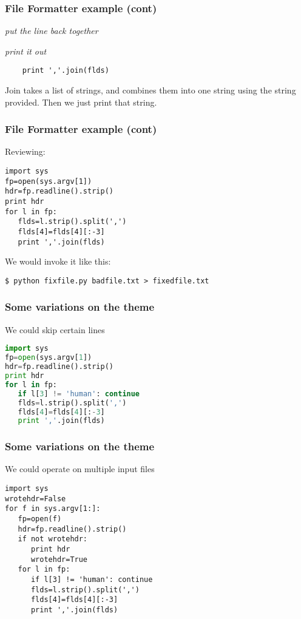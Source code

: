 \documentclass[10pt]{beamer}
\begin{document}
\begin{frame}[fragile]
\frametitle{File Formatter example (cont)}


\textit{put the line back together}

\textit{print it out}

\begin{verbatim}
    print ','.join(flds)
\end{verbatim}

Join takes a list of strings, and combines them into one string using the 
string provided. Then we just print that string.  
 
\end{frame}

\begin{frame}[fragile]
\frametitle{File Formatter example (cont)}

Reviewing:

\begin{verbatim}
import sys
fp=open(sys.argv[1])
hdr=fp.readline().strip()
print hdr
for l in fp:
   flds=l.strip().split(',')
   flds[4]=flds[4][:-3]
   print ','.join(flds)
\end{verbatim}


We would invoke it like this:
\begin{verbatim}
$ python fixfile.py badfile.txt > fixedfile.txt
\end{verbatim}

\end{frame}

\begin{frame}[fragile]
\frametitle{Some variations on the theme}

We could skip certain lines

\begin{lstlisting}[language=python]
import sys
fp=open(sys.argv[1])
hdr=fp.readline().strip()
print hdr
for l in fp:
   if l[3] != 'human': continue
   flds=l.strip().split(',')
   flds[4]=flds[4][:-3]
   print ','.join(flds)
\end{lstlisting}
\end{frame}

\begin{frame}[fragile]
\frametitle{Some variations on the theme}

We could operate on multiple input files

\begin{verbatim}
import sys
wrotehdr=False
for f in sys.argv[1:]:
   fp=open(f)
   hdr=fp.readline().strip()
   if not wrotehdr:
      print hdr
      wrotehdr=True
   for l in fp:
      if l[3] != 'human': continue
      flds=l.strip().split(',')
      flds[4]=flds[4][:-3]
      print ','.join(flds)
\end{verbatim}
\end{frame}
\end{document}
